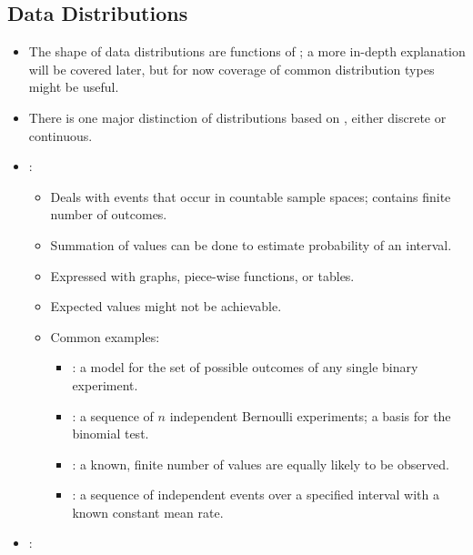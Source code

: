 \begin{itemize}
  \subsection{Data Distributions}
  \begin{itemize}
    \item The shape of data distributions are functions of \hyperref[Chapter: Probability Theory]{}; a more in-depth explanation will be covered later, but for now coverage of common distribution types might be useful.
    \item There is one major distinction of distributions based on \hyperref[Subsection: Data Types]{}, either discrete or continuous.
    \item {}:
      \begin{itemize}
        \item Deals with events that occur in countable sample spaces; contains finite number of outcomes.
        \item Summation of values can be done to estimate probability of an interval.
        \item Expressed with graphs, piece-wise functions, or tables.
        \item Expected values might not be achievable.
        \item Common examples:
        \begin{multicols}{2}
        \begin{itemize}
          \item {}: a model for the set of possible outcomes of any single binary experiment.
          \item {}: a sequence of \(n\) independent Bernoulli experiments; a basis for the binomial test.
          \item {}: a known, finite number of values are equally likely to be observed.
          \item {}: a sequence of independent events over a specified interval with a known constant mean rate.
        \end{itemize}
        \end{multicols}
      \end{itemize}
      \item {}: 

\end{itemize}
\end{itemize}

